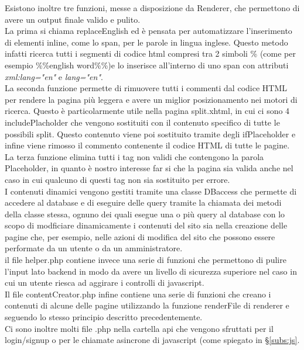 Esistono inoltre tre funzioni, messe a disposizione da Renderer, che permettono di avere un output finale valido e pulito.\\ La prima si chiama replaceEnglish ed è pensata per automatizzare l'inserimento di elementi inline, come lo span, per le parole in lingua
inglese. Questo metodo infatti ricerca tutti i segmenti di codice html compresi tra 2 simboli \% (come per esempio \%\%english word\%\%)e lo inserisce all'interno di uno span con attributi \textit{xml:lang="en"} e \textit{lang="en"}.\\ La seconda funzione permette
di rimuovere tutti i commenti dal codice HTML per rendere la pagina più leggera e avere un miglior posizionamento nei motori di ricerca. Questo è particolarmente utile nella pagina split.xhtml, in cui ci sono 4 includePlacholder che vengono sostituiti con il 
contenuto specifico di tutte le possibili split. Questo contenuto viene poi sostituito tramite degli ifPlaceholder e infine viene rimosso il commento contenente il codice HTML di tutte le pagine.\\ La terza funzione elimina tutti i tag non validi che contengono 
la parola Placeholder, in quanto è nostro interesse far si che la pagina sia valida anche nel caso in cui qualcuno di questi tag non sia sostituito per errore.\\

I contenuti dinamici vengono gestiti tramite una classe DBaccess che permette di accedere al database e di eseguire delle query tramite la chiamata dei metodi della classe stessa, ognuno dei quali esegue una o più query al database con lo scopo di modficiare 
dinamicamente i contenuti del sito sia nella creazione delle pagine che, per esempio, nelle azioni di modifica del sito che possono essere performate da un utente o da un amministratore.\\
il file helper.php contiene invece una serie di funzioni che permettono di pulire l'input lato backend in modo da avere un livello di sicurezza superiore nel caso in cui un utente riesca ad aggirare i controlli di javascript.\\
Il file contentCreator.php infine contiene una serie di funzioni che creano i contenuti di alcune delle pagine utilizzando la funzione renderFile di renderer e seguendo lo stesso principio descritto precedentemente.\\

Ci sono inoltre molti file .php nella cartella api che vengono sfruttati per il login/signup o per le chiamate asincrone di javascript (come spiegato in \S\ref{subs:js}.



